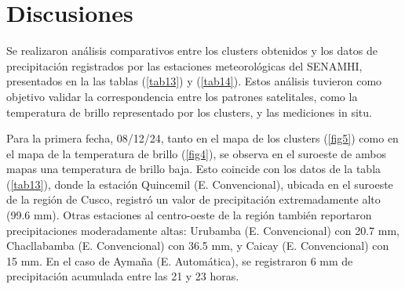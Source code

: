 \documentclass[twocolumn]{IECEjournal} %
\begin{document}
\begin{table}[h]
    \centering    
    \caption{Intensidad de las Precipitaciones en las Estaciones Automáticas Meteorológicas.} \label{tab14}
    \scriptsize %
\end{table}

\section{Discusiones}

Se realizaron análisis comparativos entre los clusters obtenidos y los datos de precipitación registrados por las estaciones meteorológicas del SENAMHI, presentados en la las tablas (\ref{tab13}) y (\ref{tab14}). Estos análisis tuvieron como objetivo validar la correspondencia entre los patrones satelitales, como la temperatura de brillo representado por los clusters, y las mediciones in situ.

Para la primera fecha, 08/12/24, tanto en el mapa de los clusters (\ref{fig5}) como en el mapa de la temperatura de brillo (\ref{fig4}), se observa en el suroeste de ambos mapas una temperatura de brillo baja. Esto coincide con los datos de la tabla (\ref{tab13}), donde la estación Quincemil (E. Convencional), ubicada en el suroeste de la región de Cusco, registró un valor de precipitación extremadamente alto (99.6 mm). Otras estaciones al centro-oeste de la región también reportaron precipitaciones moderadamente altas: Urubamba (E. Convencional) con 20.7 mm, Chacllabamba (E. Convencional) con 36.5 mm, y Caicay (E. Convencional) con 15 mm. En el caso de Aymaña (E. Automática), se registraron 6 mm de precipitación acumulada entre las 21 y 23 horas.
\end{document}
